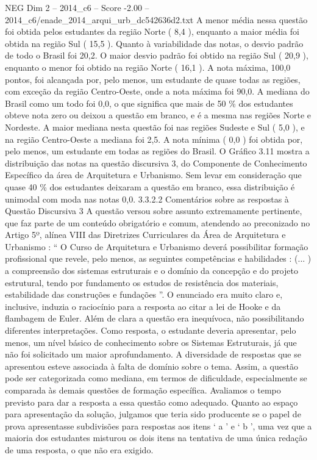 \begin{textsample}{NEG Dim 2 – 2014\_c6 – Score -2.00 – 2014\_c6/enade\_2014\_arqui\_urb\_dc542636d2.txt}
A menor média nessa questão foi obtida pelos estudantes da região Norte ( 8,4 ), enquanto a maior média foi obtida na região Sul ( 15,5 ).
Quanto à variabilidade das notas, o desvio padrão de todo o Brasil foi 20,2.
O maior desvio padrão foi obtido na região Sul ( 20,9 ), enquanto o menor foi obtido na região Norte ( 16,1 ).
A nota máxima, 100,0 pontos, foi alcançada por, pelo menos, um estudante de quase todas as regiões, com exceção da região Centro-Oeste, onde a nota máxima foi 90,0.
A mediana do Brasil como um todo foi 0,0, o que significa que mais de 50 \% dos estudantes obteve nota zero ou deixou a questão em branco, e é a mesma nas regiões Norte e Nordeste.
A maior mediana nesta questão foi nas regiões Sudeste e Sul ( 5,0 ), e na região Centro-Oeste a mediana foi 2,5.
A nota mínima ( 0,0 ) foi obtida por, pelo menos, um estudante em todas as regiões do Brasil.
O Gráfico 3.11 mostra a distribuição das notas na questão discursiva 3, do Componente de Conhecimento Específico da área de Arquitetura e Urbanismo.
Sem levar em consideração que quase 40 \% dos estudantes deixaram a questão em branco, essa distribuição é unimodal com moda nas notas 0,0. 3.3.2.2 Comentários sobre as respostas à Questão Discursiva 3 A questão versou sobre assunto extremamente pertinente, que faz parte de um conteúdo obrigatório e comum, atendendo ao preconizado no Artigo 5º, alínea VIII das Diretrizes Curriculares da Área de Arquitetura e Urbanismo : “ O Curso de Arquitetura e Urbanismo deverá possibilitar formação profissional que revele, pelo menos, as seguintes competências e habilidades : (... ) a compreensão dos sistemas estruturais e o domínio da concepção e do projeto estrutural, tendo por fundamento os estudos de resistência dos materiais, estabilidade das construções e fundações ”.
O enunciado era muito claro e, inclusive, induzia o raciocínio para a resposta ao citar a lei de Hooke e da flambagem de Euler.
Além de clara a questão era inequívoca, não possibilitando diferentes interpretações.
Como resposta, o estudante deveria apresentar, pelo menos, um nível básico de conhecimento sobre os Sistemas Estruturais, já que não foi solicitado um maior aprofundamento.
A diversidade de respostas que se apresentou esteve associada à falta de domínio sobre o tema.
Assim, a questão pode ser categorizada como mediana, em termos de dificuldade, especialmente se comparada às demais questões de formação específica.
Avaliamos o tempo previsto para dar a resposta a essa questão como adequado.
Quanto ao espaço para apresentação da solução, julgamos que teria sido producente se o papel de prova apresentasse subdivisões para respostas aos itens ‘ a ’ e ‘ b ’, uma vez que a maioria dos estudantes misturou os dois itens na tentativa de uma única redação de uma resposta, o que não era exigido.

\end{textsample}
